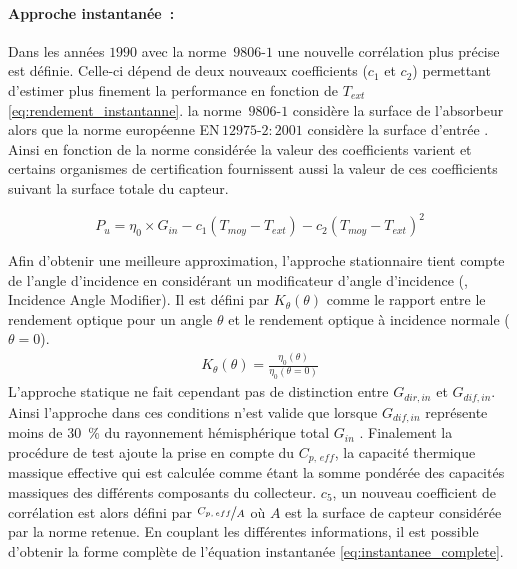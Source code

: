 \paragraph{Approche instantanée~:} %
\label{par:approche_instantanée}
Dans les années $1990$ avec la norme \,$9806$-$1$ une nouvelle corrélation plus
précise est définie. Celle-ci dépend de deux nouveaux coefficients ($c_{1}$ et $c_{2}$)
permettant d’estimer plus finement la performance en fonction de $T_{ext}$
\eqref{eq:rendement_instantanne}. la norme \,$9806$-$1$ considère la surface de
l’absorbeur alors que la norme européenne EN\,$12975$-$2:2001$ considère la surface
d’entrée \parencite{EN1297522001}. Ainsi en fonction de la norme considérée la valeur des
coefficients varient et certains organismes de certification fournissent aussi la
valeur de ces coefficients suivant la surface totale du capteur.

\begin{equation}\label{eq:rendement_instantanne}
    P_{u} = \eta_{0} \times G_{in}- c_{1} (T_{moy} - T_{ext}) - c_{2} (T_{moy} - T_{ext})^{2}
\end{equation}

Afin d’obtenir une meilleure approximation, l’approche stationnaire tient compte
de l’angle d’incidence en considérant un modificateur d’angle d’incidence (, Incidence Angle Modifier).
Il est défini par $K_{\theta}(\theta)$ comme le rapport entre le rendement optique pour un angle $\theta$
et le rendement optique à incidence normale ($\theta = 0$).
\begin{equation}\label{eq:IAM}
    \begin{aligned}
    K_{\theta}(\theta) = \frac{\eta_{0}(\theta)}{\eta_{0}(\theta = 0)}
    \end{aligned}
\end{equation}
L’approche statique ne fait cependant pas de distinction entre $G_{dir, in}$ et $G_{dif,
in}$. Ainsi l’approche dans ces conditions n’est valide que lorsque $G_{dif, in}$
représente moins de \SI{30}{\percent} du rayonnement hémisphérique total $G_{in}$ \parencite{Osorio2014}.
Finalement la procédure de test ajoute la prise en compte du $C_{p,\,eff}$, la capacité
thermique massique effective qui est calculée comme étant la somme pondérée des capacités
massiques des différents composants du collecteur. $c_{5}$, un nouveau coefficient de
corrélation est alors défini par $\nicefrac{C_{p,\,eff}}{A}$ où $A$ est la surface de
capteur considérée par la norme retenue. En couplant les différentes informations, il est
possible d’obtenir la forme complète de l’équation instantanée
\eqref{eq:instantanee_complete}.

